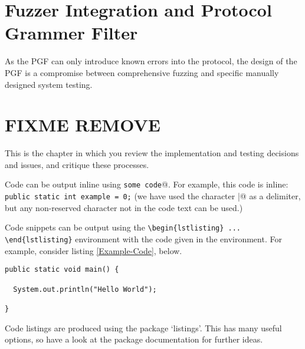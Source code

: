 \documentclass[../report.tex]{subfiles}
\begin{document}


\section{Fuzzer Integration and Protocol Grammer Filter}


As the PGF can only introduce known errors into the protocol, the design of the
PGF is a compromise between comprehensive fuzzing and specific manually
designed system testing.


\section{FIXME REMOVE}
This is the chapter in which you review the implementation and testing decisions and issues, and critique these processes.

Code can be output inline using \verb@\lstinline|some code|@.  For example, this code is inline: \lstinline|public static int example = 0;| (we have used the character \verb@|@ as a delimiter, but any non-reserved character not in the code text can be used.)

Code snippets can be output using the \verb|\begin{lstlisting} ... \end{lstlisting}|
environment with the code given in the environment. For example, consider listing \ref{Example-Code}, below.

\begin{lstlisting}[breaklines,breakatwhitespace,caption={Example code},label=Example-Code]
public static void main() {

  System.out.println("Hello World");

}
\end{lstlisting}

Code listings are produced using the package `listings'.  This has many useful options, so have a look at the package documentation for further ideas.
\end{document}
